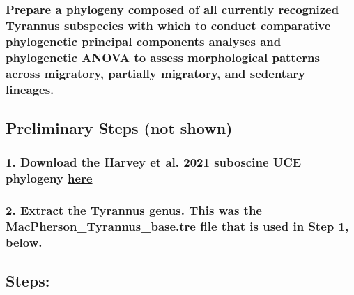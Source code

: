 \documentclass[]{article}
\begin{document}
\subsubsection{Prepare a phylogeny composed of all currently recognized
Tyrannus subspecies with which to conduct comparative phylogenetic
principal components analyses and phylogenetic ANOVA to assess
morphological patterns across migratory, partially migratory, and
sedentary
lineages.}\label{prepare-a-phylogeny-composed-of-all-currently-recognized-tyrannus-subspecies-with-which-to-conduct-comparative-phylogenetic-principal-components-analyses-and-phylogenetic-anova-to-assess-morphological-patterns-across-migratory-partially-migratory-and-sedentary-lineages.}

\subsection{Preliminary Steps (not
shown)}\label{preliminary-steps-not-shown}

\subsubsection{\texorpdfstring{1. Download the Harvey et al. 2021
suboscine UCE phylogeny
\href{https://github.com/mgharvey/tyranni\#tyranni}{here}}{1. Download the Harvey et al. 2021 suboscine UCE phylogeny here}}\label{download-the-harvey-et-al.-2021-suboscine-uce-phylogeny-here}

\subsubsection{\texorpdfstring{2. Extract the Tyrannus genus. This was
the
\href{https://github.com/mmacphe/Tyrannus_morphology/blob/main/MacPherson_Tyrannus_base.tre}{MacPherson\_Tyrannus\_base.tre}
file that is used in Step 1,
below.}{2. Extract the Tyrannus genus. This was the MacPherson\_Tyrannus\_base.tre file that is used in Step 1, below.}}\label{extract-the-tyrannus-genus.-this-was-the-macpherson_tyrannus_base.tre-file-that-is-used-in-step-1-below.}

\subsection{Steps:}\label{steps}
\end{document}
